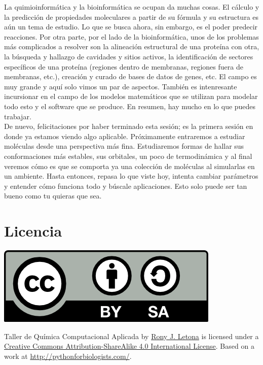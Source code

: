 \documentclass[10pt,letterpaper]{article}
\begin{document}
La quimioinform\'atica y la bioinform\'atica se ocupan da muchas cosas. El c\'alculo y la predicci\'on de propiedades moleculares a partir de su f\'ormula y su estructura es a\'un un tema de estudio. Lo que se busca ahora, sin embargo, es el poder predecir reacciones. Por otra parte, por el lado de la bioinform\'atica, unos de los problemas m\'as complicados a resolver son la alineaci\'on estructural de una prote\'ina con otra, la b\'usqueda y hallazgo de cavidades y sitios activos, la identificaci\'on de sectores espec\'ificos de una prote\'ina (regiones dentro de membranas, regiones fuera de membranas, etc.), creaci\'on y curado de bases de datos de genes, etc. El campo es muy grande y aqu\'i solo vimos un par de aspectos. Tambi\'en es intenresante incursionar en el campo de los modelos matem\'aticos que se utilizan para modelar todo esto y el software que se produce. En resumen, hay mucho en lo que puedes trabajar.\\

De nuevo, felicitaciones por haber terminado esta sesi\'on; es la primera sesi\'on en donde ya estamos viendo algo aplicable. Pr\'oximamente entraremos a estudiar mol\'eculas desde una perspectiva m\'as fina. Estudiaremos formas de hallar sus conformaciones m\'as estables, sus orbitales, un poco de termodin\'amica y al final veremos c\'omo es que se comporta ya una colecci\'on de mol\'eculas al simularlas en un ambiente. Hasta entonces, repasa lo que viste hoy, intenta cambiar par\'ametros y entender c\'omo funciona todo y b\'uscale aplicaciones. Esto solo puede ser tan bueno como tu quieras que sea.

\section*{Licencia}

\noindent \includegraphics{img/cc_big.png}

\noindent Taller de Qu\'imica Computacional Aplicada by \href{http://github.com/zronyj/TC3Q}{Rony J. Letona} is licensed under a \href{http://creativecommons.org/licenses/by-sa/4.0/}{Creative Commons Attribution-ShareAlike 4.0 International License}.
Based on a work at \url{http://pythonforbiologists.com/}.
\end{document}
